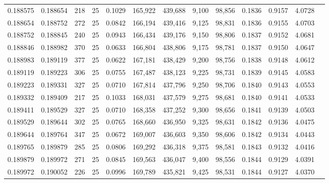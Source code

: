 \begin{tabular}{rrrrrrrrrrrrr}
0.188575 & 0.188654 &   218 &  25 &                                     0.1029 & 165,922 & 439,688 &   9,100 &  98,856 & 0.1836 & 0.9157 & 4.0728 \\
0.188654 & 0.188752 &   272 &  25 &                                     0.0842 & 166,194 & 439,416 &   9,125 &  98,831 & 0.1836 & 0.9155 & 4.0703 \\
0.188752 & 0.188845 &   240 &  25 &                                     0.0943 & 166,434 & 439,176 &   9,150 &  98,806 & 0.1837 & 0.9152 & 4.0681 \\
0.188846 & 0.188982 &   370 &  25 &                                     0.0633 & 166,804 & 438,806 &   9,175 &  98,781 & 0.1837 & 0.9150 & 4.0647 \\
0.188983 & 0.189119 &   377 &  25 &                                     0.0622 & 167,181 & 438,429 &   9,200 &  98,756 & 0.1838 & 0.9148 & 4.0612 \\
0.189119 & 0.189223 &   306 &  25 &                                     0.0755 & 167,487 & 438,123 &   9,225 &  98,731 & 0.1839 & 0.9145 & 4.0583 \\
0.189223 & 0.189331 &   327 &  25 &                                     0.0710 & 167,814 & 437,796 &   9,250 &  98,706 & 0.1840 & 0.9143 & 4.0553 \\
0.189332 & 0.189409 &   217 &  25 &                                     0.1033 & 168,031 & 437,579 &   9,275 &  98,681 & 0.1840 & 0.9141 & 4.0533 \\
0.189411 & 0.189529 &   327 &  25 &                                     0.0710 & 168,358 & 437,252 &   9,300 &  98,656 & 0.1841 & 0.9139 & 4.0503 \\
0.189529 & 0.189644 &   302 &  25 &                                     0.0765 & 168,660 & 436,950 &   9,325 &  98,631 & 0.1842 & 0.9136 & 4.0475 \\
0.189644 & 0.189764 &   347 &  25 &                                     0.0672 & 169,007 & 436,603 &   9,350 &  98,606 & 0.1842 & 0.9134 & 4.0443 \\
0.189765 & 0.189879 &   285 &  25 &                                     0.0806 & 169,292 & 436,318 &   9,375 &  98,581 & 0.1843 & 0.9132 & 4.0416 \\
0.189879 & 0.189972 &   271 &  25 &                                     0.0845 & 169,563 & 436,047 &   9,400 &  98,556 & 0.1844 & 0.9129 & 4.0391 \\
0.189972 & 0.190052 &   226 &  25 &                                     0.0996 & 169,789 & 435,821 &   9,425 &  98,531 & 0.1844 & 0.9127 & 4.0370 \\

\end{tabular}
